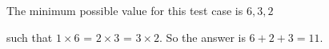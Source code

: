The minimum possible value for this test case is $6,3,2$

such that $1\times 6$ = $2 \times 3$ = $3\times 2$. So the answer is $6+2+3=11$.